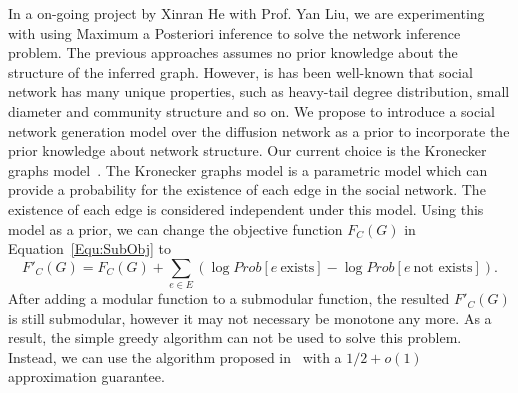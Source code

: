 In a on-going project by Xinran He with Prof. Yan Liu, we are experimenting with using Maximum a Posteriori inference to solve the network inference problem. The previous approaches assumes no prior knowledge about the structure of the inferred graph. However, is has been well-known that social network has many unique properties, such as heavy-tail degree distribution, small diameter and community structure and so on. We propose to introduce a social network generation model over the diffusion network as a prior to incorporate the prior knowledge about network structure. Our current choice is the Kronecker graphs model~\cite{JDJCZ10,KJ11}. The Kronecker graphs model is a parametric model which can provide a probability for the existence of each edge in the social network. The existence of each edge is considered independent under this model. Using this model as a prior, we can change the objective function $F_C(G)$ in Equation~\ref{Equ:SubObj} to
$$
F'_C(G) = F_C(G) + \sum_{e\in E}(\log Prob[e\ \text{exists}]-\log Prob[e\ \text{not exists}]).
$$
 After adding a modular function to a submodular function, the resulted $F'_C(G)$ is still submodular, however it may not necessary be monotone any more. As a result, the simple greedy algorithm can not be used to solve this problem. Instead, we can use the algorithm proposed in~\cite{FeldmanNS11} with a $1/2+o(1)$ approximation guarantee.
%
%

